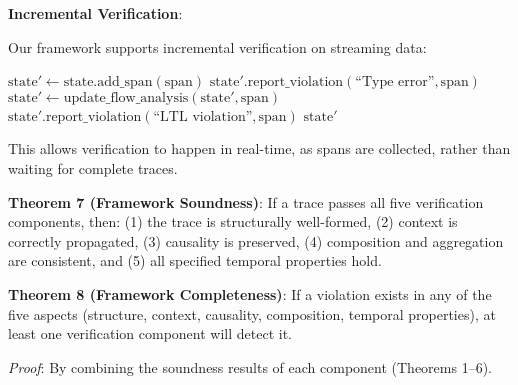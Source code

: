 \textbf{Incremental Verification}:

Our framework supports incremental verification on streaming data:

\begin{algorithmic}[1]
    \State $\text{state}' \gets \text{state}.\text{add\_span}(\text{span})$
        \State $\text{state}'.\text{report\_violation}(\text{``Type error''}, \text{span})$
    \EndIf
    \State $\text{state}' \gets \text{update\_flow\_analysis}(\text{state}', \text{span})$
        \State $\text{state}'.\text{report\_violation}(\text{``LTL violation''}, \text{span})$
    \EndIf
    \State \Return $\text{state}'$
\EndFunction
\end{algorithmic}

This allows verification to happen in real-time, as spans are collected, rather than waiting for complete traces.

\textbf{Theorem 7 (Framework Soundness)}:
If a trace passes all five verification components, then: (1) the trace is structurally well-formed, (2) context is correctly propagated, (3) causality is preserved, (4) composition and aggregation are consistent, and (5) all specified temporal properties hold.

\textbf{Theorem 8 (Framework Completeness)}:
If a violation exists in any of the five aspects (structure, context, causality, composition, temporal properties), at least one verification component will detect it.

\emph{Proof}: By combining the soundness results of each component (Theorems 1--6).
